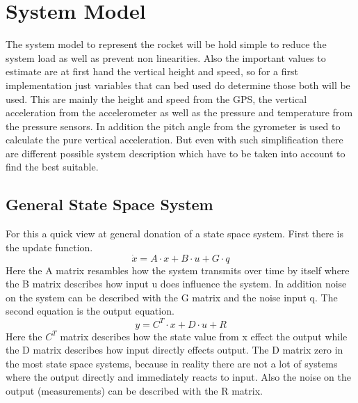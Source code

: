   \section{System Model}
  The system model to represent the rocket will be hold simple to reduce the system load as well as prevent non linearities.
  Also the important values to estimate are at first hand the vertical height and speed, so
  for a first implementation just variables that can bed used do determine those both will be used.
  This are mainly the height and speed from the GPS, the vertical acceleration from the accelerometer
  as well as the pressure and temperature from the pressure sensors. In addition the pitch angle from the gyrometer is used to calculate the pure vertical acceleration.
  But even with such simplification there are different possible system description which have to be taken into account 
  to find the best suitable.
  
  \subsection{General State Space System}
  For this a quick view at general donation of a state space system. First there is the update function.
  $$ \dot{x} = A \cdot x + B \cdot u + G \cdot q$$
  Here the A matrix resambles how the system transmits over time by itself where the B matrix describes how input u does influence the system.
  In addition noise on the system can be described with the G matrix and the noise input q.
  The second equation is the output equation.
  $$ y = C^T \cdot x + D \cdot u + R $$
  Here the $C^T$ matrix describes how the state value from x effect the output while the D matrix describes how input directly effects output.
  The D matrix zero in the most state space systems, because in reality there are not a lot of systems where the output directly and immediately reacts to input.
  Also the noise on the output (measurements) can be described with the R matrix.
  
